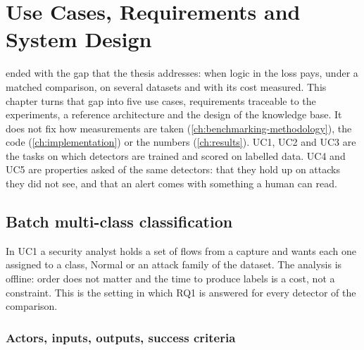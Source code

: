 \chapter{Use Cases, Requirements and System Design}
\label{ch:usecases-design}

 ended with the gap that the thesis addresses: when logic in
the loss pays, under a matched comparison, on several datasets and with its cost
measured. This chapter turns that gap into five use cases, requirements traceable
to the experiments, a reference architecture and the design of the knowledge base.
It does not fix how measurements are taken (\cref{ch:benchmarking-methodology}),
the code (\cref{ch:implementation}) or the numbers (\cref{ch:results}).
UC1, UC2 and UC3 are the tasks on which detectors are trained and scored on
labelled data. UC4 and UC5 are properties asked of the same detectors: that they
hold up on attacks they did not see, and that an alert comes with something a
human can read.

\section{Batch multi-class classification}
\label{sec:uc1}

In UC1 a security analyst holds a set of flows from a capture and wants each one
assigned to a class, Normal or an attack family of the dataset. The analysis is
offline: order does not matter and the time to produce labels is a cost, not a
constraint. This is the setting in which RQ1 is answered for every detector of the
comparison.

\subsection{Actors, inputs, outputs, success criteria}
\label{sec:uc1-actors}

